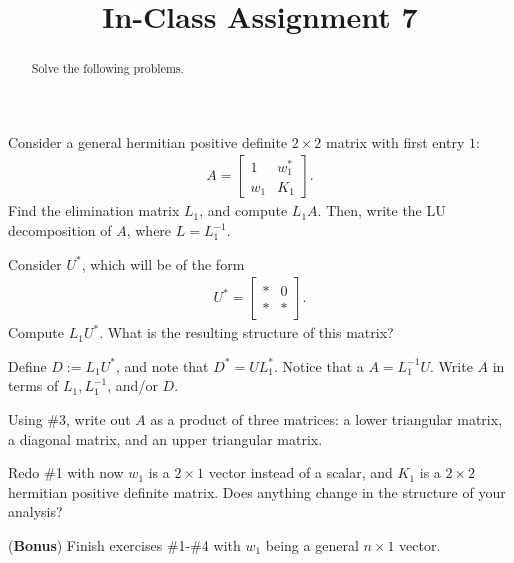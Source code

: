 \documentclass{ximera}
\begin{document}
    \title{In-Class Assignment 7}
    
    \begin{abstract} Solve the following problems.
    \end{abstract}
    \maketitle

\begin{exercise}
    Consider a general hermitian positive definite $2\times 2$ matrix with first entry $1$:
    \begin{align*}
        A = \begin{bmatrix}
            1 & w_1^* \\
            w_1 & K_1
        \end{bmatrix}.
    \end{align*}
    Find the elimination matrix $L_1$, and compute $L_1A$.  Then, write the LU decomposition of $A$, where $L = L_1^{-1}$.
    \vfill
\end{exercise}

\begin{exercise}
    Consider $U^*$, which will be of the form
    \begin{align*}
        U^* = \begin{bmatrix}
            * & 0 \\ * & *
        \end{bmatrix}.
    \end{align*}
    Compute $L_1 U^*$.  What is the resulting structure of this matrix?
    \vfill
\end{exercise}
\newpage

\begin{exercise}
    Define $D:= L_1U^*$, and note that $D^* = UL_1^*$.  Notice that a
    $A = L_1^{-1}U$.  Write $A$ in terms of $L_1, L_1^{-1}$, and/or $D$.
\end{exercise}

\vfill

\begin{exercise}
    Using \#3, write out $A$ as a product of three matrices: a lower triangular matrix, a diagonal matrix, and an upper triangular matrix.
\end{exercise}
\vfill
\newpage
\begin{exercise}
    Redo \#1 with now $w_1$ is a $2\times 1$ vector instead of a scalar, and $K_1$ is a $2 \times 2$ hermitian positive definite matrix.  Does anything change in the structure of your analysis? 
\end{exercise}

\vfill

\begin{exercise} (\textbf{Bonus})
Finish exercises \#1-\#4 with $w_1$ being a general $n \times 1$ vector.    
\end{exercise}

\vfill
\end{document}
